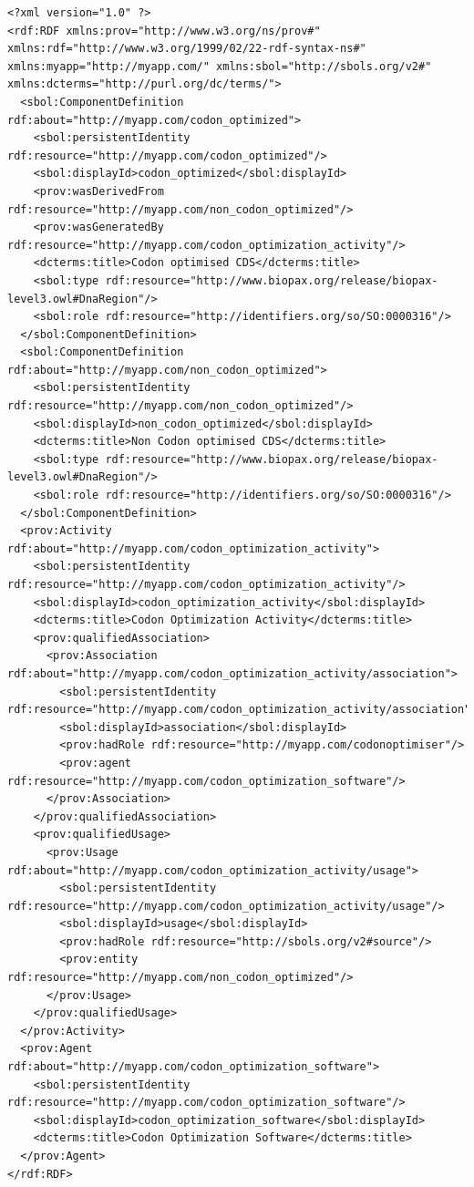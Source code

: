 \begin{lstlisting}
<?xml version="1.0" ?>
<rdf:RDF xmlns:prov="http://www.w3.org/ns/prov#" xmlns:rdf="http://www.w3.org/1999/02/22-rdf-syntax-ns#" xmlns:myapp="http://myapp.com/" xmlns:sbol="http://sbols.org/v2#" xmlns:dcterms="http://purl.org/dc/terms/">
  <sbol:ComponentDefinition rdf:about="http://myapp.com/codon_optimized">
    <sbol:persistentIdentity rdf:resource="http://myapp.com/codon_optimized"/>
    <sbol:displayId>codon_optimized</sbol:displayId>
    <prov:wasDerivedFrom rdf:resource="http://myapp.com/non_codon_optimized"/>
    <prov:wasGeneratedBy rdf:resource="http://myapp.com/codon_optimization_activity"/>
    <dcterms:title>Codon optimised CDS</dcterms:title>
    <sbol:type rdf:resource="http://www.biopax.org/release/biopax-level3.owl#DnaRegion"/>
    <sbol:role rdf:resource="http://identifiers.org/so/SO:0000316"/>
  </sbol:ComponentDefinition>
  <sbol:ComponentDefinition rdf:about="http://myapp.com/non_codon_optimized">
    <sbol:persistentIdentity rdf:resource="http://myapp.com/non_codon_optimized"/>
    <sbol:displayId>non_codon_optimized</sbol:displayId>
    <dcterms:title>Non Codon optimised CDS</dcterms:title>
    <sbol:type rdf:resource="http://www.biopax.org/release/biopax-level3.owl#DnaRegion"/>
    <sbol:role rdf:resource="http://identifiers.org/so/SO:0000316"/>
  </sbol:ComponentDefinition>
  <prov:Activity rdf:about="http://myapp.com/codon_optimization_activity">
    <sbol:persistentIdentity rdf:resource="http://myapp.com/codon_optimization_activity"/>
    <sbol:displayId>codon_optimization_activity</sbol:displayId>
    <dcterms:title>Codon Optimization Activity</dcterms:title>
    <prov:qualifiedAssociation>
      <prov:Association rdf:about="http://myapp.com/codon_optimization_activity/association">
        <sbol:persistentIdentity rdf:resource="http://myapp.com/codon_optimization_activity/association"/>
        <sbol:displayId>association</sbol:displayId>
        <prov:hadRole rdf:resource="http://myapp.com/codonoptimiser"/>
        <prov:agent rdf:resource="http://myapp.com/codon_optimization_software"/>
      </prov:Association>
    </prov:qualifiedAssociation>
    <prov:qualifiedUsage>
      <prov:Usage rdf:about="http://myapp.com/codon_optimization_activity/usage">
        <sbol:persistentIdentity rdf:resource="http://myapp.com/codon_optimization_activity/usage"/>
        <sbol:displayId>usage</sbol:displayId>
        <prov:hadRole rdf:resource="http://sbols.org/v2#source"/>
        <prov:entity rdf:resource="http://myapp.com/non_codon_optimized"/>
      </prov:Usage>
    </prov:qualifiedUsage>
  </prov:Activity>
  <prov:Agent rdf:about="http://myapp.com/codon_optimization_software">
    <sbol:persistentIdentity rdf:resource="http://myapp.com/codon_optimization_software"/>
    <sbol:displayId>codon_optimization_software</sbol:displayId>
    <dcterms:title>Codon Optimization Software</dcterms:title>
  </prov:Agent>
</rdf:RDF>
\end{lstlisting}

